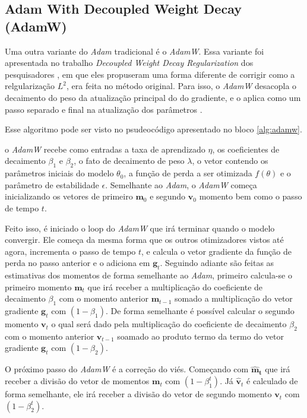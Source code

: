 \subsection{Adam With Decoupled Weight Decay (AdamW)}

Uma outra variante do \textit{Adam} tradicional é o \textit{AdamW}. Essa variante foi apresentada no trabalho \textit{Decoupled Weight Decay Regularization} dos pesquisadores \textcite{AdamWMethod}, em que eles propuseram uma forma diferente de corrigir como a relgularização $L^2$, era feita no método original. Para isso, o \textit{AdamW} desacopla o decaimento do peso da atualização principal do do gradiente, e o aplica como um passo separado e final na atualização dos parâmetros \parencite{AdamWMethod}.

Esse algoritmo pode ser visto no psudeocódigo apresentado no bloco \ref{alg:adamw}.

o \textit{AdamW} recebe como entradas a taxa de aprendizado $\eta$, os coeficientes de decaimento $\beta_1$ e $\beta_2$, o fato de decaimento de peso $\lambda$, o vetor contendo os parâmetros iniciais do modelo $\theta_0$, a função de perda a ser otimizada $f(\theta)$ e o parâmetro de estabilidade $\epsilon$. Semelhante ao \textit{Adam}, o \textit{AdamW} começa inicializando os vetores de primeiro $\mathbf{m}_0$ e segundo $\mathbf{v}_0$ momento bem como o passo de tempo $t$.

Feito isso, é iniciado o loop do \textit{AdamW} que irá terminar quando o modelo convergir. Ele começa da mesma forma que os outros otimizadores vistos até agora, incrementa o passo de tempo $t$, e calcula o vetor gradiente da função de perda no passo anterior e o adiciona em $\mathbf{g}_t$. Seguindo adiante são feitas as estimativas dos momentos de forma semelhante ao \textit{Adam}, primeiro calcula-se o primeiro momento $\mathbf{m}_t$ que irá receber a multiplicação do coeficiente de decaimento $\beta_1$ com o momento anterior $\mathbf{m}_{t-1}$ somado a multiplicação do vetor gradiente $\mathbf{g}_t$ com $(1 - \beta_1)$. De forma semelhante é possível calcular o segundo momento $\mathbf{v}_t$ o qual será dado pela multiplicação do coeficiente de decaimento $\beta_2$ com o momento anterior $\mathbf{v}_{t-1}$ soamado ao produto termo da termo do vetor gradiente $\mathbf{g}_t$ com $(1 - \beta_2)$.

O próximo passo do \textit{AdamW} é a correção do viés. Começando com $\mathbf{\hat{m}_t}$ que irá receber a divisão do vetor de momentos $\mathbf{m}_t$ com $(1 - \beta_1^t)$. Já $\mathbf{\hat{v}}_t$ é calculado de forma semelhante, ele irá receber a divisão do vetor de segundo momento $\mathbf{v}_t$ com $(1 - \beta_2^t)$.


